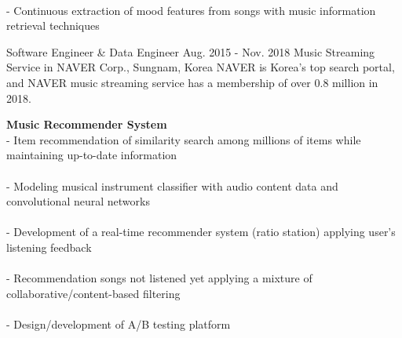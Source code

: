 \begin{cventries}
{\begin{cvitems}
{                         \\
                    - Continuous extraction of mood features from songs with music information retrieval techniques \\
                         \nn
                }
            \end{cvitems}
        }

    \cventry
        {Software Engineer \& Data Engineer} %
        {Aug. 2015 - Nov. 2018} %
        {Music Streaming Service in NAVER Corp., } %
        {Sungnam, Korea}%
        { %
            NAVER is Korea's top search portal, and NAVER music streaming service has a membership of over 0.8 million in 2018.
        }
        { %
            \begin{cvitems}
                \item {
                    {\bf Music Recommender System} \\
                    - Item recommendation of similarity search among millions of items while maintaining up-to-date information \\
                         \\
                    - Modeling musical instrument classifier with audio content data and convolutional neural networks \\
                         \\
                    - Development of a real-time recommender system (ratio station) applying user's listening feedback \\
                         \\
                    - Recommendation songs not listened yet applying a mixture of collaborative/content-based filtering \\
                         \\
                    - Design/development of A/B testing platform 
                         \nn
                }
            \end{cvitems}
        }
\end{cventries}